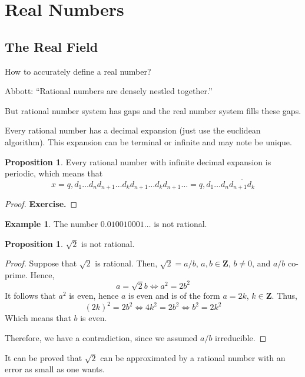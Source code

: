 \documentclass[12pt,a4paper]{article}
\theoremstyle{definition}
\newtheorem{proposition}[theorem]{Proposition}
\newtheorem{example}{Example}[section]
\begin{document}
\newpage
\section{Real Numbers}

\subsection{The Real Field}

How to accurately define a real number?

Abbott: ``Rational numbers are densely nestled together.''

But rational number system has gaps and the real number system fills
these gaps.

Every rational number has a decimal expansion (just use the euclidean algorithm). This expansion can be terminal or infinite and may note be unique.

\begin{proposition}
	Every rational number with infinite decimal expansion is periodic, which means that \[ x = q, d_1 \ldots d_n d_{n+1} \ldots d_k d_{n+1} \ldots d_k d_{n+1} \ldots = q, d_1 \ldots d_n \overline{d_{n+1} d_k} \]
\end{proposition}

\begin{proof}
	\textbf{Exercise.}
\end{proof}

\begin{example}
	The number $0.010010001 \ldots$ is not rational.
\end{example}

\begin{proposition}
	$\sqrt{2}$ is not rational.
\end{proposition}

\begin{proof}
	Suppose that $\sqrt{2}$ is rational. Then, $\sqrt{2} = a/b$, $a, b \in \textbf{Z}$, $b \neq 0$, and $a/b$ co-prime. Hence,
	\[ a = \sqrt{2} b \iff a^2 = 2b^2 \]
	It follows that $a^2$ is even, hence $a$ is even and is of the form $a = 2k$, $k \in \textbf{Z}$. Thus,
	\[ (2k)^2 = 2b^2 \iff 4k^2 = 2b^2 \iff b^2 = 2k^2 \]
	Which means that $b$ is even. 
	
	Therefore, we have a contradiction, since we assumed $a/b$ irreducible.
\end{proof}

It can be proved that $\sqrt{2}$ can be approximated by a rational number with an error as small as one wants. 
\end{document}
